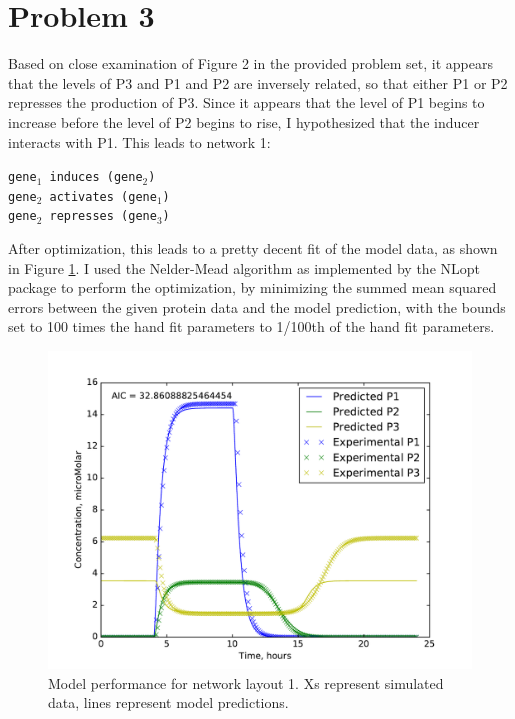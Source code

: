\documentclass{article}
\begin{document}
\section*{Problem 3} 
Based on close examination of Figure 2 in the provided problem set, it appears that the levels of P3 and P1 and P2 are inversely related, so that either P1 or P2 represses the production of P3. Since it appears that the level of P1 begins to increase before the level of P2 begins to rise, I hypothesized that the inducer interacts with P1. This leads to network 1:\\

\begin{centering}
\texttt{gene$_1$ induces (gene$_2$)\\
gene$_2$ activates (gene$_1$) \\
gene$_2$ represses (gene$_3$)}\\
\end{centering}

After optimization, this leads to a pretty decent fit of the model data, as shown in Figure \ref{fig:P3Layout1}. I used the Nelder-Mead algorithm as implemented by the NLopt package to perform the optimization, by minimizing the summed mean squared errors between the given protein data and the model prediction, with the bounds set to 100 times the hand fit parameters to 1/100th of the hand fit parameters.
\begin{figure}[!htb]
\includegraphics[width=12cm]{../Problem3/figures/postNMPlotLayout1}
\caption{Model performance for network layout 1. Xs represent simulated data, lines represent model predictions.}
\label{fig:P3Layout1}
\end{figure}
\end{document}
